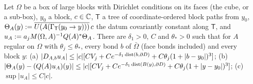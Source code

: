 \begin{lemma}\label{lem:a01:FL}
Let $\Omega$ be a box of large blocks with Dirichlet conditions on its faces (the cube, or a sub-box), $y_0$ a block, $c\in\mathbb C$, $\mathsf T$ a tree of coordinate-ordered block paths from $y_0$, $\Theta_A(y):=\overline{U(A(\Gamma_{\mathsf T}(y_0\to y)))}\,c$ the datum covariantly constant along $\mathsf T$, and $u_A:= a_jM(\Omega,A)^{-1}Q(A)^*\Theta_A$. There are $\delta_1>0$, $C$ and $\theta_*>0$ such that for $A$ regular on $\Omega$ with $\theta_j\le\theta_*$, every bond $b$ of $\bar\Omega$ (face bonds included) and every block $y$: (a) $|D_{A,b}u_A|\le|c|[CV_j+Ce^{-\delta_1\operatorname{dist}(b,\partial D)}+C\theta_j(1+|b-y_0|)^3]$; (b) $|\Theta_A(y)-(Q(A)u_A)(y)|\le|c|[CV_j+Ce^{-\delta_1\operatorname{dist}(B(y),\partial D)}+C\theta_j(1+|y-y_0|)^3]$; (c) $\sup|u_A|\le C|c|$.
\end{lemma}
